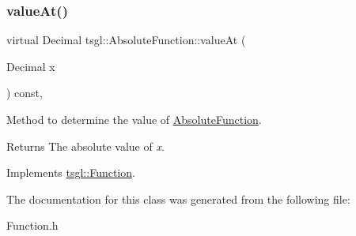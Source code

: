 \subsubsection{\texorpdfstring{value\+At()}{valueAt()}}
{\footnotesize\ttfamily virtual Decimal tsgl\+::\+Absolute\+Function\+::value\+At (\begin{DoxyParamCaption}\item[{Decimal}]{x }\end{DoxyParamCaption}) const\hspace{0.3cm}{\ttfamily [inline]}, {\ttfamily [virtual]}}



Method to determine the value of \hyperlink{classtsgl_1_1_absolute_function}{Absolute\+Function}. 

\begin{DoxyReturn}{Returns}
The absolute value of {\itshape x}. 
\end{DoxyReturn}


Implements \hyperlink{classtsgl_1_1_function_affb7b3b19a04efefa29a9870d666e912}{tsgl\+::\+Function}.



The documentation for this class was generated from the following file\+:\begin{DoxyCompactItemize}
\item 
Function.\+h\end{DoxyCompactItemize}
